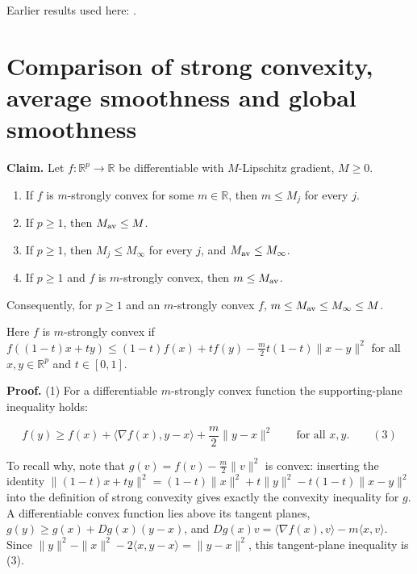 \documentclass[11pt,a4paper]{article}
\begin{document}
Earlier results used here: \cite[Section~3.9.1]{LangevinLean2026ULASC}.

\section{\texorpdfstring{Comparison of strong convexity, average smoothness and global smoothness}{Comparison of strong convexity, average smoothness and global smoothness}}


\textbf{Claim.} Let \(f:\mathbb R^p\to\mathbb R\) be differentiable with \(M\)-Lipschitz gradient, \(M\ge0\).



\begin{enumerate}


\item If \(f\) is \(m\)-strongly convex for some \(m\in\mathbb R\), then \(m\le M_j\) for every \(j\).

\item If \(p\ge1\), then \(M_{\rm av}\le M\).

\item If \(p\ge1\), then \(M_j\le M_\infty\) for every \(j\), and \(M_{\rm av}\le M_\infty\).

\item If \(p\ge1\) and \(f\) is \(m\)-strongly convex, then \(m\le M_{\rm av}\).

\end{enumerate}



Consequently, for \(p\ge1\) and an \(m\)-strongly convex \(f\), \(m\le M_{\rm av}\le M_\infty\le M\).




Here \(f\) is \(m\)-strongly convex if \(f((1-t)x+ty)\le(1-t)f(x)+tf(y)-\frac m2t(1-t)\|x-y\|^2\) for all \(x,y\in\mathbb R^p\) and \(t\in[0,1]\).




\textbf{Proof.} (1) For a differentiable \(m\)-strongly convex function the supporting-plane inequality holds:


\[f(y)\ge f(x)+\langle\nabla f(x),y-x\rangle+\frac m2\|y-x\|^2\qquad\text{for all }x,y.\qquad(3)\]


To recall why, note that \(g(v)=f(v)-\frac m2\|v\|^2\) is convex: inserting the identity \(\|(1-t)x+ty\|^2=(1-t)\|x\|^2+t\|y\|^2-t(1-t)\|x-y\|^2\) into the definition of strong convexity gives exactly the convexity inequality for \(g\). A differentiable convex function lies above its tangent planes, \(g(y)\ge g(x)+Dg(x)(y-x)\), and \(Dg(x)v=\langle\nabla f(x),v\rangle-m\langle x,v\rangle\). Since \(\|y\|^2-\|x\|^2-2\langle x,y-x\rangle=\|y-x\|^2\), this tangent-plane inequality is (3).
\end{document}
